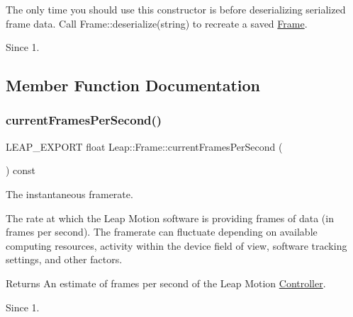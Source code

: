 \begin{DoxyCodeInclude}
\end{DoxyCodeInclude}


The only time you should use this constructor is before deserializing serialized frame data. Call {\ttfamily Frame\+::deserialize(string)} to recreate a saved \hyperlink{class_leap_1_1_frame}{Frame}.

\begin{DoxySince}{Since}
1. 
\end{DoxySince}


\subsection{Member Function Documentation}
\mbox{\label{class_leap_1_1_frame_a7171bec9ea419733a69599bfb09cf38d}} 
\subsubsection{\texorpdfstring{current\+Frames\+Per\+Second()}{currentFramesPerSecond()}}
{\footnotesize\ttfamily L\+E\+A\+P\+\_\+\+E\+X\+P\+O\+RT float Leap\+::\+Frame\+::current\+Frames\+Per\+Second (\begin{DoxyParamCaption}{ }\end{DoxyParamCaption}) const}

The instantaneous framerate.

The rate at which the Leap Motion software is providing frames of data (in frames per second). The framerate can fluctuate depending on available computing resources, activity within the device field of view, software tracking settings, and other factors.


\begin{DoxyCodeInclude}
\end{DoxyCodeInclude}


\begin{DoxyReturn}{Returns}
An estimate of frames per second of the Leap Motion \hyperlink{class_leap_1_1_controller}{Controller}. 
\end{DoxyReturn}
\begin{DoxySince}{Since}
1. 
\end{DoxySince}
\mbox{\label{class_leap_1_1_frame_ae9c75248baae66a299ac3a478cf8f9d7}} 
